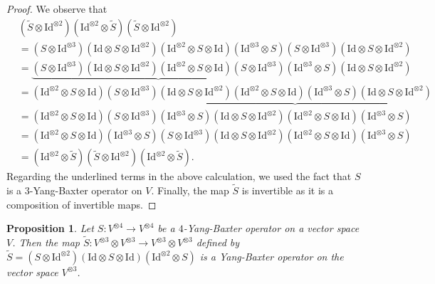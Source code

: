 \documentclass[a4paper,reqno,10pt]{amsart}
\theoremstyle{plain}
\newtheorem{prop}[thm]{Proposition}
\theoremstyle{definition}
\theoremstyle{remark}
\begin{document}
\begin{proof}
    We observe that
    \begin{align*}
        &(\widetilde{S} \otimes \mathrm{Id}^{\otimes 2}) (\mathrm{Id}^{\otimes 2} \otimes \widetilde{S}) (\widetilde{S} \otimes \mathrm{Id}^{\otimes 2}) \\
        &= (S \otimes \mathrm{Id}^{\otimes 3}) (\mathrm{Id} \otimes S \otimes \mathrm{Id}^{\otimes 2}) (\mathrm{Id}^{\otimes 2} \otimes S \otimes \mathrm{Id}) (\mathrm{Id}^{\otimes 3} \otimes S)  (S \otimes \mathrm{Id}^{\otimes 3}) (\mathrm{Id} \otimes S \otimes \mathrm{Id}^{\otimes 2}) \\
        &=  \underbrace{(S \otimes \mathrm{Id}^{\otimes 3})  (\mathrm{Id} \otimes S \otimes \mathrm{Id}^{\otimes 2}) (\mathrm{Id}^{\otimes 2} \otimes S \otimes \mathrm{Id}) (S \otimes \mathrm{Id}^{\otimes 3})}  (\mathrm{Id}^{\otimes 3} \otimes S) (\mathrm{Id} \otimes S \otimes \mathrm{Id}^{\otimes 2}) \\ 
        &= (\mathrm{Id}^{\otimes 2} \otimes S \otimes \mathrm{Id}) (S \otimes \mathrm{Id}^{\otimes 3}) \underbrace{ (\mathrm{Id} \otimes S \otimes \mathrm{Id}^{\otimes 2}) (\mathrm{Id}^{\otimes 2} \otimes S \otimes \mathrm{Id}) (\mathrm{Id}^{\otimes 3} \otimes S) (\mathrm{Id} \otimes S \otimes \mathrm{Id}^{\otimes 2})} \\ 
        &= (\mathrm{Id}^{\otimes 2} \otimes S \otimes \mathrm{Id}) (S \otimes \mathrm{Id}^{\otimes 3}) (\mathrm{Id}^{\otimes 3} \otimes S)  (\mathrm{Id} \otimes S \otimes \mathrm{Id}^{\otimes 2}) (\mathrm{Id}^{\otimes 2} \otimes S \otimes \mathrm{Id}) (\mathrm{Id}^{\otimes 3} \otimes S) \\
        &= (\mathrm{Id}^{\otimes 2} \otimes S \otimes \mathrm{Id}) (\mathrm{Id}^{\otimes 3} \otimes S)  (S \otimes \mathrm{Id}^{\otimes 3})  (\mathrm{Id} \otimes S \otimes \mathrm{Id}^{\otimes 2})  (\mathrm{Id}^{\otimes 2} \otimes S \otimes \mathrm{Id}) (\mathrm{Id}^{\otimes 3} \otimes S) \\
        &= (\mathrm{Id}^{\otimes 2} \otimes \widetilde{S})   (\widetilde{S} \otimes \mathrm{Id}^{\otimes 2}) (\mathrm{Id}^{\otimes 2} \otimes \widetilde{S}).
    \end{align*}
    Regarding the underlined terms in the above calculation, we used the fact that $S$ is a $3$-Yang-Baxter operator on $V$. Finally, the map $\widetilde{S}$ is invertible as it is a composition of invertible maps.
\end{proof}

\begin{prop}
    Let $S : V^{\otimes 4} \rightarrow V^{\otimes 4}$ be a $4$-Yang-Baxter operator on a vector space $V$. Then the map $\widetilde{S} : V^{\otimes 3} \otimes  V^{\otimes 3}  \rightarrow V^{\otimes 3} \otimes  V^{\otimes 3}$ defined by $\widetilde{S} = (S \otimes \mathrm{Id}^{\otimes 2}) (\mathrm{Id} \otimes S \otimes \mathrm{Id}) (\mathrm{Id}^{\otimes 2} \otimes S)$ is a Yang-Baxter operator on the vector space $V^{\otimes 3}$.
\end{prop}
\end{document}
